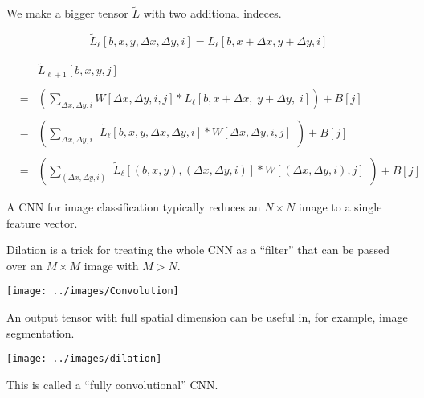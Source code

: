 {{\vfill
We make a bigger tensor $\tilde{L}$ with two additional indeces.

$$\tilde{L}_{{\ell}}[b,x,y,\Delta x,\Delta y,i] = L_{{\ell}}[b,x+\Delta x,y+\Delta y,i]$$


\begin{eqnarray*}
  & & \tilde{L}_{{\ell+1}}[b,x,y,j] \\
  \\
  & = & \left(\sum_{\Delta x, \Delta y, i} W[\Delta x, \Delta y, i, j] *L_{{\ell}}[b,x + \Delta x,\; y + \Delta y,\; i]\right) + B[j] \\
  \\
      & = & \left(\sum_{\Delta x, \Delta y, i} \begin{array}{l}
                                              \tilde{L}_{{\ell}}[b,x,y,\Delta x,\Delta y,i]
                                              * W[\Delta x, \Delta y, i, j] \\
  \end{array}\right) + B[j] \\
  \\
    & = & \left(\sum_{(\Delta x, \Delta y, i)} \begin{array}{l}
                                              \tilde{L}_{{\ell}}[(b,x,y),(\Delta x,\Delta y,i)]
                                              * W[(\Delta x, \Delta y, i), j] \\
                                           \end{array}\right) + B[j]
\end{eqnarray*}
}


A CNN for image classification typically reduces an $N \times N$ image to a single feature vector.

\vfill
Dilation is a trick for treating the whole CNN as a ``filter'' that can be passed over an $M \times M$ image with $M > N$.

\vfill
\centerline{\texttt{[image: ../images/Convolution]}}

\vfill
An output tensor with full spatial dimension can be useful in, for example, image segmentation.


\centerline{\texttt{[image: ../images/dilation]}}

\vfill
This is called a ``fully convolutional'' CNN.

}
